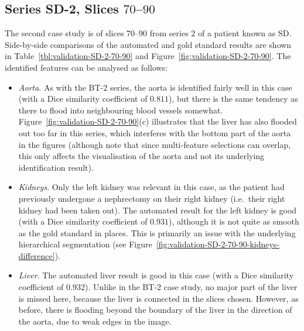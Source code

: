 \afterpage{\clearpage}
\newpage

\subsection{Series SD-2, Slices $70$--$90$}

The second case study is of slices $70$--$90$ from series $2$ of a patient known as SD. Side-by-side comparisons of the automated and gold standard results are shown in Table~\ref{tbl:validation-SD-2-70-90} and Figure~\ref{fig:validation-SD-2-70-90}. The identified features can be analysed as follows:
%
\begin{itemize}

\item \emph{Aorta}. As with the BT-2 series, the aorta is identified fairly well in this case (with a Dice similarity coefficient of $0.811$), but there is the same tendency as there to flood into neighbouring blood vessels somewhat. Figure~\ref{fig:validation-SD-2-70-90}(c) illustrates that the liver has also flooded out too far in this series, which interferes with the bottom part of the aorta in the figures (although note that since multi-feature selections can overlap, this only affects the visualisation of the aorta and not its underlying identification result).

\item \emph{Kidneys}. Only the left kidney was relevant in this case, as the patient had previously undergone a nephrectomy on their right kidney (i.e.~their right kidney had been taken out). The automated result for the left kidney is good (with a Dice similarity coefficient of $0.931$), although it is not quite as smooth as the gold standard in places. This is primarily an issue with the underlying hierarchical segmentation (see Figure~\ref{fig:validation-SD-2-70-90-kidneys-difference}).

\item \emph{Liver}. The automated liver result is good in this case (with a Dice similarity coefficient of $0.932$). Unlike in the BT-2 case study, no major part of the liver is missed here, because the liver is connected in the slices chosen. However, as before, there is flooding beyond the boundary of the liver in the direction of the aorta, due to weak edges in the image.


\end{itemize}
